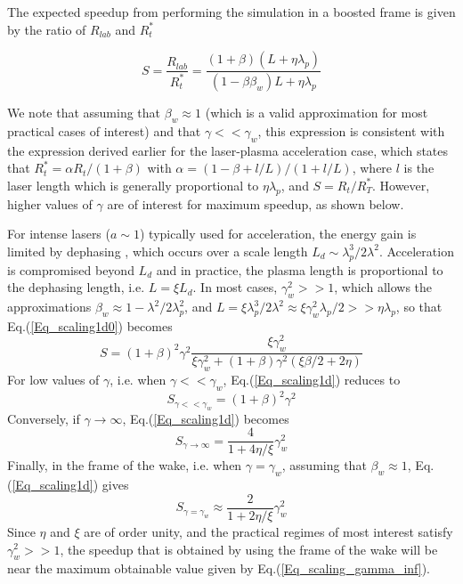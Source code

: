 The expected speedup from performing the simulation in a boosted frame is given by the ratio of $R_{lab}$ and $R_t^*$

\begin{equation}
S=\frac{R_{lab}}{R_t^*}=\frac{\left(1+\beta\right)\left(L+\eta \lambda_p\right)}{\left(1-\beta\beta_w\right)L+\eta \lambda_p}
\label{Eq_scaling1d0}
\end{equation}

We note that assuming that $\beta_w\approx1$ (which is a valid approximation for most practical cases of interest) and that $\gamma<<\gamma_w$, this expression is consistent with the expression derived earlier \cite{Vayprl07} for the laser-plasma acceleration case, which states that $R_t^*=\alpha R_t/\left(1+\beta\right)$ with $\alpha=\left(1-\beta+l/L\right)/\left(1+l/L\right)$, where $l$ is the laser length which is generally proportional to $\eta \lambda_p$, and $S=R_t/R_T^*$. However, higher values of $\gamma$ are of interest for maximum speedup, as shown below.

For intense lasers ($a\sim 1$) typically used for acceleration, the energy gain is limited by dephasing \cite{Schroederprl2011}, which occurs over a scale length $L_d \sim \lambda_p^3/2\lambda^2$.
Acceleration is compromised beyond $L_d$ and in practice, the plasma length is proportional to the dephasing length, i.e. $L= \xi L_d$. In most cases, $\gamma_w^2>>1$, which allows the approximations $\beta_w\approx1-\lambda^2/2\lambda_p^2$, and $L=\xi \lambda_p^3/2\lambda^2\approx \xi \gamma_w^2 \lambda_p/2>>\eta \lambda_p$, so that Eq.(\ref{Eq_scaling1d0}) becomes
%
\begin{equation}
S=\left(1+\beta\right)^2\gamma^2\frac{\xi\gamma_w^2}{\xi\gamma_w^2+\left(1+\beta\right)\gamma^2\left(\xi\beta/2+2\eta\right)}
\label{Eq_scaling1d}
\end{equation}
%
For low values of $\gamma$, i.e. when $\gamma<<\gamma_w$, Eq.(\ref{Eq_scaling1d}) reduces to
%
\begin{equation}
S_{\gamma<<\gamma_w}=\left(1+\beta\right)^2\gamma^2
\label{Eq_scaling1d_simpl2}
\end{equation}
%
Conversely, if $\gamma\rightarrow\infty$, Eq.(\ref{Eq_scaling1d}) becomes
%
\begin{equation}
S_{\gamma\rightarrow\infty}=\frac{4}{1+4\eta/\xi}\gamma_w^2
\label{Eq_scaling_gamma_inf}
\end{equation}
%
Finally, in the frame of the wake, i.e. when $\gamma=\gamma_w$, assuming that $\beta_w\approx1$, Eq.(\ref{Eq_scaling1d}) gives
%
\begin{equation}
S_{\gamma=\gamma_w}\approx\frac{2}{1+2\eta/\xi}\gamma_w^2
\label{Eq_scaling_gamma_wake}
\end{equation}
Since $\eta$ and $\xi$ are of order unity, and the practical regimes of most interest satisfy $\gamma_w^2>>1$, the speedup that is obtained by using the frame of the wake will be near the maximum obtainable value given by Eq.(\ref{Eq_scaling_gamma_inf}).

